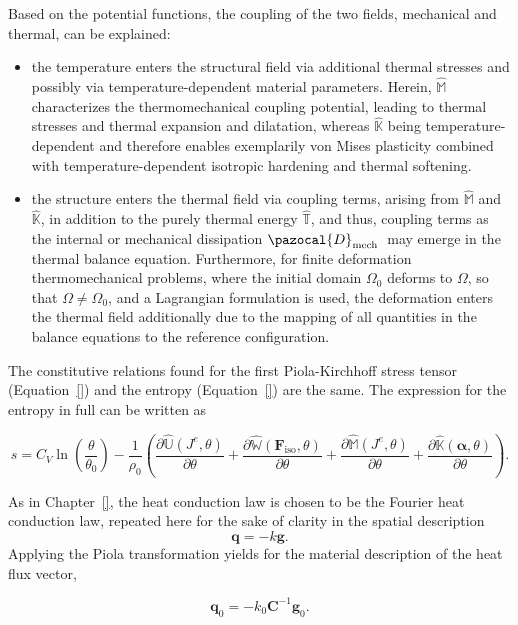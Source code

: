 Based on the potential functions, the coupling of the two fields, mechanical and thermal, can be explained:
\begin{itemize}
  \item the temperature enters the structural field via additional thermal stresses and possibly via temperature-dependent material parameters.
  Herein, \(\hat{\mathbb{M}}\) characterizes the thermomechanical coupling potential, leading to thermal stresses and thermal expansion and dilatation, whereas \(\hat{\mathbb{K}}\) being temperature-dependent and therefore enables exemplarily von Mises plasticity combined with temperature-dependent isotropic hardening and thermal softening.
  \item the structure enters the thermal field via coupling terms, arising from \(\hat{\mathbb{M}}\) and \(\hat{\mathbb{K}}\), in addition to the purely thermal energy \(\hat{\mathbb T}\), and thus, coupling terms as the internal or mechanical dissipation \(\pazocal{D}_{\text {mech }}\) may emerge in the thermal balance equation. Furthermore, for finite deformation thermomechanical problems, where the initial domain \(\Omega_{0}\) deforms to \(\Omega\), so that \(\Omega \neq \Omega_{0}\), and a Lagrangian formulation is used, the deformation enters the thermal field additionally due to the mapping of all quantities in the balance equations to the reference configuration.
\end{itemize}

The constitutive relations found for the first Piola-Kirchhoff stress tensor (Equation~\eqref{}) and the entropy (Equation~\eqref{}) are the same.
The expression for the entropy in full can be written as
\begin{highlight}
  \begin{equation}
    s = C_{V} \ln \left(\frac{\theta}{\theta_{0}}\right)-\frac{1}{\rho_{0}}\left(\frac{\partial \hat{\mathbb{U}}\left(J^e,\theta\right)}{\partial \theta} + \frac{\partial \hat{\mathbb{W}}(\bm{F}_\text{iso},\theta)}{\partial \theta} + \frac{\partial \hat{\mathbb{M}}\left(J^{e}, \theta\right)}{\partial \theta}+\frac{\partial \hat{\mathbb{K}}\left(\bm \alpha, \theta\right)}{\partial \theta}\right).
  \end{equation}
\end{highlight}

As in Chapter~\ref{}, the heat conduction law is chosen to be the Fourier heat conduction law, repeated here for the sake of clarity in the spatial description
\begin{equation}
  \bm q = - k \bm g.
\end{equation}
Applying the Piola transformation yields for the material description of the heat flux vector,
\begin{highlight}
  \begin{equation}
    \bm q_0 = - k_0 \bm C^{-1} \bm g_0.
  \end{equation}
\end{highlight}

